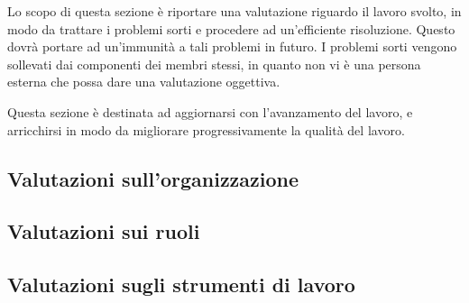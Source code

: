 \documentclass[../piano-di-qualifica.tex]{subfiles}
\begin{document}
  Lo scopo di questa sezione è riportare una valutazione riguardo il lavoro svolto, in modo da trattare
  i problemi sorti e procedere ad un'efficiente risoluzione.
  Questo dovrà portare ad un'immunità a tali problemi in futuro.
  I problemi sorti vengono sollevati dai componenti dei membri stessi, in quanto non vi è una
  persona esterna che possa dare una valutazione oggettiva.

  Questa sezione è destinata ad aggiornarsi con l'avanzamento del lavoro, e arricchirsi in modo
  da migliorare progressivamente la qualità del lavoro.

  \subsection{Valutazioni sull'organizzazione}
  \subsection{Valutazioni sui ruoli}
  \subsection{Valutazioni sugli strumenti di lavoro}
\end{document}
